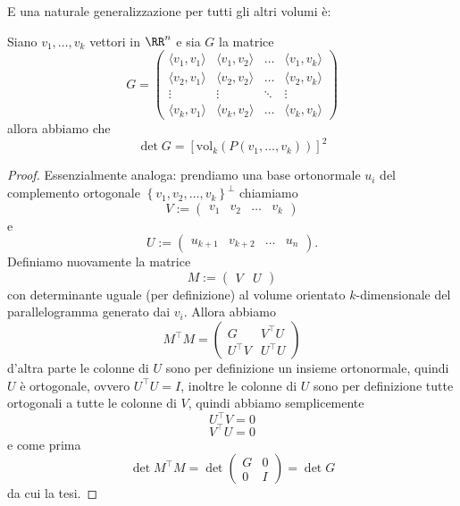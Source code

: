 \documentclass[11pt]{scrartcl}
\begin{document}
   	 E una naturale generalizzazione per tutti gli altri volumi è:
   	 \begin{theorem}
   	 	Siano $v_1,\dots,v_k$ vettori in $\RR^n$ e sia $G$ la matrice 
   	 	$$G=
   	 	\begin{pmatrix}
   	 		\langle v_1, v_1 \rangle & \langle v_1,v_2\rangle & \dots & \langle v_1,v_{k} \rangle \\
   	 		\langle v_2, v_1 \rangle & \langle v_2,v_2\rangle & \dots & \langle v_2,v_{k} \rangle \\
   	 		\vdots & \vdots & \ddots & \vdots \\
   	 		\langle v_{k}, v_1 \rangle & \langle v_{k}, v_2\rangle & \dots & \langle v_{k},v_{k} \rangle
   	 	\end{pmatrix}
   	 	$$
   	 	allora abbiamo che 
   	 	$$\det G = [\text{vol}_k(P(v_1,\dots,v_k))]^2$$
   	 \end{theorem}
   	 \begin{proof}
   	 	Essenzialmente analoga: prendiamo una base ortonormale $u_i$ del complemento ortogonale $\left\{v_1,v_2,\dots,v_k\right\}^\perp$ chiamiamo 
   	 	$$V:=\left(
   	 	\begin{array}{c|c|c|c}
   	 		v_1 & v_2 & \dots & v_k
   	 	\end{array}
   	 	\right)$$
   	 	e 
   	 	$$U:=\left(
   	 	\begin{array}{c|c|c|c}
   	 		u_{k+1} & v_{k+2} & \dots & u_n
   	 	\end{array}
   	 	\right).$$
   	 	Definiamo nuovamente la matrice 
   	 	$$M:=\left(\begin{array}{c|c}
   	 		V & U
   	 	\end{array}\right)$$
   	 	con determinante uguale (per definizione) al volume orientato $k$-dimensionale del parallelogramma generato dai $v_i$. Allora abbiamo
   	 	$$M^\intercal M = \left(
   	 	\begin{array}{c|c}
   	 		G & V^\intercal U \\
   	 		\hline
   	 		U^\intercal V & U^\intercal U
   	 	\end{array}
   	 	\right)$$
   	 	d'altra parte le colonne di $U$ sono per definizione un insieme ortonormale, quindi $U$ è ortogonale, ovvero $U^\intercal U =I$, inoltre le colonne di $U$ sono per definizione tutte ortogonali a tutte le colonne di $V$, quindi abbiamo semplicemente
   	 	$$U^\intercal V =0$$
   	 	$$V^\intercal U=0$$
   	 	e come prima
   	 	$$\det M^\intercal M = \det\left(
   	 	\begin{array}{c|c}
   	 		G & 0 \\
   	 		\hline
   	 		0 & I
   	 	\end{array}
   	 	\right)=\det G$$
   	 	da cui la tesi.
   	 \end{proof}
   	 
\end{document}
